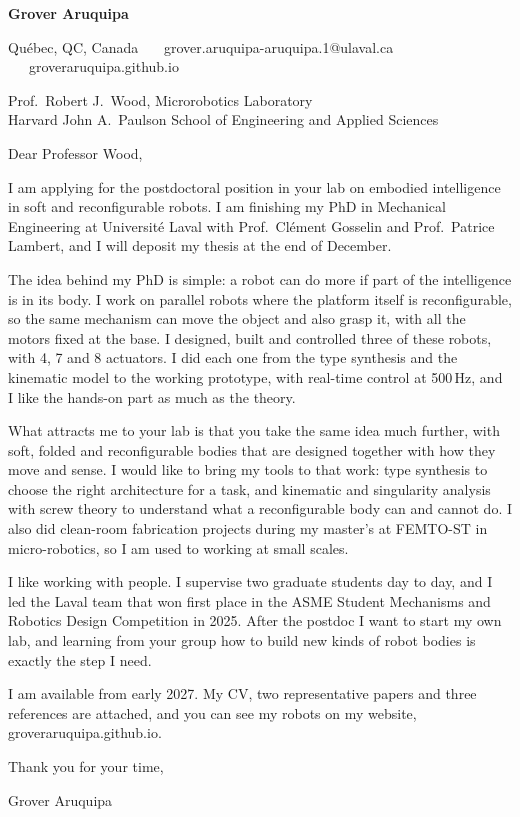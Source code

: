 \documentclass[11pt,letterpaper]{article}
\begin{document}
{\large\bfseries Grover Aruquipa}\par\vspace{-6pt}
{\small Qu\'ebec, QC, Canada \ \textbullet\ \ grover.aruquipa-aruquipa.1@ulaval.ca \ \textbullet\ \ groveraruquipa.github.io}

\vspace{4pt}
Prof.\ Robert J.\ Wood, Microrobotics Laboratory\\
Harvard John A.\ Paulson School of Engineering and Applied Sciences

Dear Professor Wood,

I am applying for the postdoctoral position in your lab on embodied intelligence in soft and reconfigurable robots. I am finishing my PhD in Mechanical Engineering at Universit\'e Laval with Prof.\ Cl\'ement Gosselin and Prof.\ Patrice Lambert, and I will deposit my thesis at the end of December.

The idea behind my PhD is simple: a robot can do more if part of the intelligence is in its body. I work on parallel robots where the platform itself is reconfigurable, so the same mechanism can move the object and also grasp it, with all the motors fixed at the base. I designed, built and controlled three of these robots, with 4, 7 and 8 actuators. I did each one from the type synthesis and the kinematic model to the working prototype, with real-time control at 500\,Hz, and I like the hands-on part as much as the theory.

What attracts me to your lab is that you take the same idea much further, with soft, folded and reconfigurable bodies that are designed together with how they move and sense. I would like to bring my tools to that work: type synthesis to choose the right architecture for a task, and kinematic and singularity analysis with screw theory to understand what a reconfigurable body can and cannot do. I also did clean-room fabrication projects during my master's at FEMTO-ST in micro-robotics, so I am used to working at small scales.

I like working with people. I supervise two graduate students day to day, and I led the Laval team that won first place in the ASME Student Mechanisms and Robotics Design Competition in 2025. After the postdoc I want to start my own lab, and learning from your group how to build new kinds of robot bodies is exactly the step I need.

I am available from early 2027. My CV, two representative papers and three references are attached, and you can see my robots on my website, groveraruquipa.github.io.

Thank you for your time,

Grover Aruquipa
\end{document}
